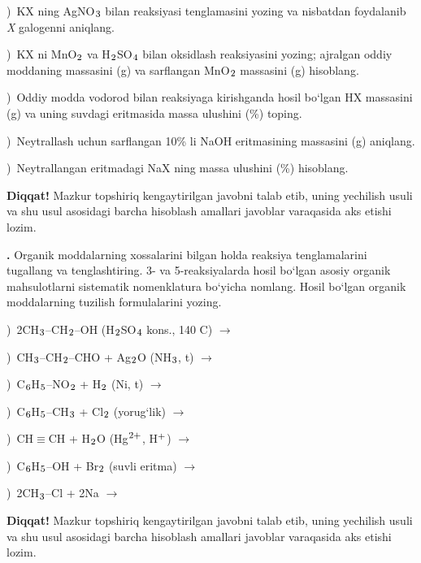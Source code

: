 \documentclass[11pt,a4paper]{article}
\renewcommand{\textsubscript}[1]{\ensuremath{_{\text{\fontsize{8}{8}\selectfont #1}}}}
\renewcommand{\textsuperscript}[1]{\ensuremath{^{\text{\fontsize{8}{8}\selectfont #1}}}}
\newcommand{\qn}[1]{\textbf{\fontsize{11.5}{13}\selectfont #1}}
\newcommand{\qsep}{\par\vspace{13pt}}
\newcommand{\diqqat}[1]{\par\smallskip\noindent\textbf{Diqqat!} #1\par\medskip}
\begin{document}
)\ KX ning AgNO\textsubscript{3} bilan reaksiyasi tenglamasini yozing va nisbatdan foydalanib \textit{X} galogenni aniqlang.\par
{})\ KX ni MnO\textsubscript{2} va H\textsubscript{2}SO\textsubscript{4} bilan oksidlash reaksiyasini yozing; ajralgan oddiy moddaning massasini (g) va sarflangan MnO\textsubscript{2} massasini (g) hisoblang.\par
{})\ Oddiy modda vodorod bilan reaksiyaga kirishganda hosil bo`lgan HX massasini (g) va uning suvdagi eritmasida massa ulushini (\%) toping.\par
{})\ Neytrallash uchun sarflangan 10\% li NaOH eritmasining massasini (g) aniqlang.\par
{})\ Neytrallangan eritmadagi NaX ning massa ulushini (\%) hisoblang.\par
\diqqat{Mazkur topshiriq kengaytirilgan javobni talab etib, uning yechilish usuli va shu usul asosidagi barcha hisoblash amallari javoblar varaqasida aks etishi lozim.}\qsep
\noindent\qn{42.} Organik moddalarning xossalarini bilgan holda reaksiya tenglamalarini tugallang va tenglashtiring. 3- va 5-reaksiyalarda hosil bo`lgan asosiy organik mahsulotlarni sistematik nomenklatura bo`yicha nomlang. Hosil bo`lgan organik moddalarning tuzilish formulalarini yozing.\par
{})\ 2CH\textsubscript{3}--CH\textsubscript{2}--OH (H\textsubscript{2}SO\textsubscript{4} kons., 140 \textdegree{}C) $\to$\par
{})\ CH\textsubscript{3}--CH\textsubscript{2}--CHO + Ag\textsubscript{2}O (NH\textsubscript{3}, t) $\to$\par
{})\ C\textsubscript{6}H\textsubscript{5}--NO\textsubscript{2} + H\textsubscript{2} (Ni, t) $\to$\par
{})\ C\textsubscript{6}H\textsubscript{5}--CH\textsubscript{3} + Cl\textsubscript{2} (yorug`lik) $\to$\par
{})\ CH$\equiv$CH + H\textsubscript{2}O (Hg\textsuperscript{2+}, H\textsuperscript{+}) $\to$\par
{})\ C\textsubscript{6}H\textsubscript{5}--OH + Br\textsubscript{2} (suvli eritma) $\to$\par
{})\ 2CH\textsubscript{3}--Cl + 2Na $\to$\par
\diqqat{Mazkur topshiriq kengaytirilgan javobni talab etib, uning yechilish usuli va shu usul asosidagi barcha hisoblash amallari javoblar varaqasida aks etishi lozim.}\qsep
\end{document}
